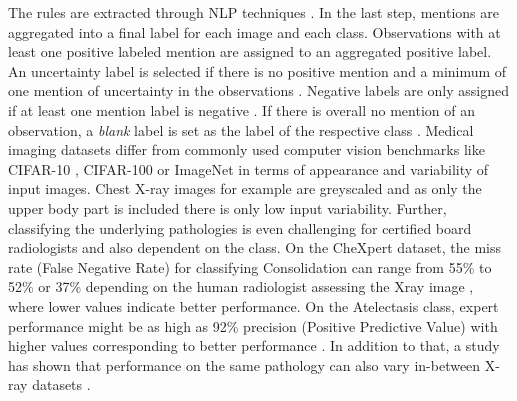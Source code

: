The rules are extracted through NLP techniques \citep{Irvin2019}.
In the last step, mentions are aggregated into a final label for each image and each class.
Observations with at least one positive labeled mention are assigned to an aggregated positive label.
An uncertainty label is selected if there is no positive mention and a minimum of one mention of uncertainty in the observations \citep{Irvin2019}.
Negative labels are only assigned if at least one mention label is negative \citep{Irvin2019}. 
If there is overall no mention of an observation, a \textit{blank} label is set as the label of the respective class \citep{Irvin2019}.
Medical imaging datasets differ from commonly used computer vision benchmarks like CIFAR-10 \citep{Krizhevsky2009a}, CIFAR-100 \citep{Krizhevsky2009b} or ImageNet \citep{Deng2009} in terms of appearance and variability of input images.
Chest X-ray images for example are greyscaled and as only the upper body part is included there is only low input variability.
Further, classifying the underlying pathologies is even challenging for certified board radiologists and also dependent on the class.
On the CheXpert dataset, the miss rate (False Negative Rate) for classifying Consolidation can range from 55\% to 52\% or 37\% depending on the human radiologist assessing the Xray image \citep{Irvin2019}, where lower values indicate better performance.
On the Atelectasis class, expert performance might be as high as 92\% precision (Positive Predictive Value) with higher values corresponding to better performance \citep{Irvin2019}.
In addition to that, a study has shown that performance on the same pathology can also vary in-between X-ray datasets \citep{Majkowska2020}.
\par
